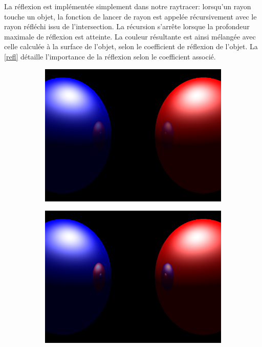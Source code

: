 \documentclass{article}
\begin{document}
La réflexion est implémentée simplement dans notre raytracer: lorsqu'un rayon
touche un objet, la fonction de lancer de rayon est appelée récursivement avec
le rayon réfléchi issu de l'intersection. La récursion s'arrête lorsque la
profondeur maximale de réflexion est atteinte. La couleur résultante est ainsi
mélangée avec celle calculée à la surface de l'objet, selon le coefficient de
réflexion de l'objet. La \cref{refl} détaille l'importance de la
réflexion selon le coefficient associé.

\begin{figure}[hb]
  \begin{subfigure}{0.45\textwidth}
    \includegraphics[width=1\textwidth]{images/refl025.png}
  \end{subfigure}
  \begin{subfigure}{0.45\textwidth}
    \includegraphics[width=1\textwidth]{images/refl05.png}
  \end{subfigure}


\end{figure}
\end{document}
